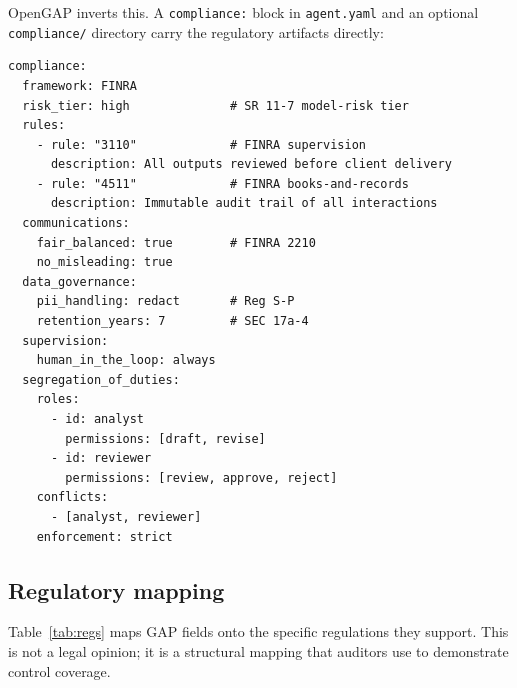 \documentclass[11pt,a4paper]{article}
\begin{document}
OpenGAP inverts this. A \texttt{compliance:} block in \texttt{agent.yaml} and an
optional \texttt{compliance/} directory carry the regulatory artifacts directly:

\begin{lstlisting}[language=yamlex]
compliance:
  framework: FINRA
  risk_tier: high              # SR 11-7 model-risk tier
  rules:
    - rule: "3110"             # FINRA supervision
      description: All outputs reviewed before client delivery
    - rule: "4511"             # FINRA books-and-records
      description: Immutable audit trail of all interactions
  communications:
    fair_balanced: true        # FINRA 2210
    no_misleading: true
  data_governance:
    pii_handling: redact       # Reg S-P
    retention_years: 7         # SEC 17a-4
  supervision:
    human_in_the_loop: always
  segregation_of_duties:
    roles:
      - id: analyst
        permissions: [draft, revise]
      - id: reviewer
        permissions: [review, approve, reject]
    conflicts:
      - [analyst, reviewer]
    enforcement: strict
\end{lstlisting}

\subsection{Regulatory mapping}

Table~\ref{tab:regs} maps GAP fields onto the specific regulations they support. This
is not a legal opinion; it is a structural mapping that auditors use to demonstrate
control coverage.
\end{document}
